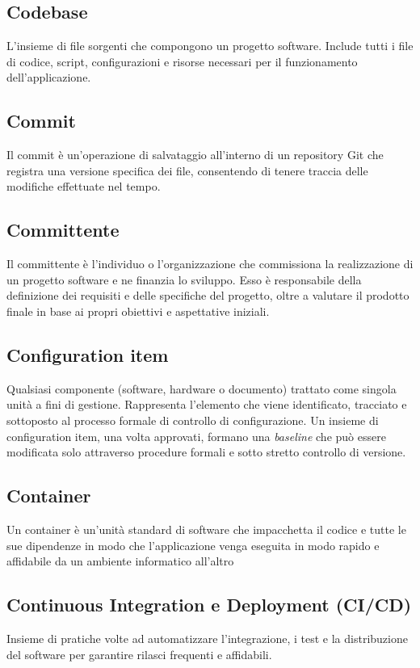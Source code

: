 \documentclass[10pt, letterpaper]{article}
\begin{document}
\subsection*{Codebase}
L'insieme di file sorgenti che compongono un progetto software. Include tutti i file di codice,
script, configurazioni e risorse necessari per il funzionamento dell'applicazione.

\subsection*{Commit}
Il commit è un'operazione di salvataggio all'interno di un repository Git che registra una versione specifica dei file, consentendo di tenere traccia delle modifiche
effettuate nel tempo.

\subsection*{Committente}
Il committente è l'individuo o l'organizzazione che commissiona la realizzazione di un progetto software e ne finanzia lo sviluppo. Esso è responsabile della definizione dei
requisiti e delle specifiche del progetto, oltre a valutare il prodotto finale in base ai propri obiettivi e aspettative iniziali.

\subsection*{Configuration item}
Qualsiasi componente (software, hardware o documento) trattato come singola unità a fini di gestione. Rappresenta l'elemento che viene identificato, tracciato e sottoposto al processo formale di controllo di configurazione. Un insieme di configuration item, una volta approvati, formano una \textit{baseline} che può essere modificata solo attraverso procedure formali e sotto stretto controllo di versione.

\subsection*{Container}
Un container è un'unità standard di software che impacchetta il codice e tutte le sue dipendenze in modo che l'applicazione venga eseguita in modo rapido e
affidabile da un ambiente informatico all'altro

\subsection*{Continuous Integration e Deployment (CI/CD)}
Insieme di pratiche volte ad automatizzare l'integrazione, i test e la distribuzione del software per garantire rilasci frequenti e affidabili.
\end{document}

